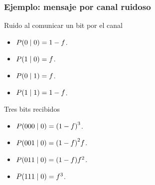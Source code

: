 \documentclass[table]{beamer}
\begin{document}
\begin{frame}
    \frametitle{Ejemplo: mensaje por canal ruidoso}
    \begin{block}{Ruido al comunicar un bit por el canal}
        \begin{itemize}
            \item $\prob{0 \mid 0} = 1 - f$.
            \item $\prob{1 \mid 0} = f$.
            \item $\prob{0 \mid 1} = f$.
            \item $\prob{1 \mid 1} = 1 - f$.
        \end{itemize}
    \end{block}
    \begin{block}{Tres bits recibidos}
        \begin{itemize}
            \item $\prob{000 \mid 0} = \parens{1 - f}^{3}$.
            \item $\prob{001 \mid 0} = \parens{1 - f}^{2} f$.
            \item $\prob{011 \mid 0} = \parens{1 - f} f^{2}$.
            \item $\prob{111 \mid 0} = f^{3}$.
        \end{itemize}
    \end{block}
\end{frame}
\end{document}
